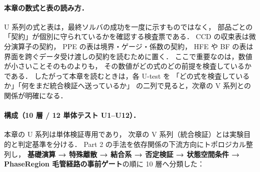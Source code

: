 \paragraph{本章の数式と表の読み方．}
U 系列の式と表は，最終ソルバの成功を一度に示すものではなく，
部品ごとの「契約」が個別に守られているかを確認する検査票である．
CCD の収束表は微分演算子の契約，
PPE の表は境界・ゲージ・係数の契約，
HFE や BF の表は界面を跨ぐデータ受け渡しの契約を読むために置く．
ここで重要なのは，数値が小さいことそのものよりも，
その数値がどの式のどの前提を検査しているかである．
したがって本章を読むときは，各 U-test を
「どの式を検査しているか」「何をまだ統合検証へ送っているか」
の二列で見ると，次章の V 系列との関係が明確になる．

\paragraph{構成（10 層 / 12 単体テスト U1--U12）．}
本章の U 系列は単体検証専用であり，
次章の V 系列（統合検証）とは実験目的と判定基準を分ける．
Part 2 の手法を依存関係の下流方向にトポロジカル整列し，
\textbf{基礎演算 → 特殊離散 → 結合系 → 否定検証 → 状態空間条件 → PhaseRegion 毛管経路の事前ゲート}の順に 10 層へ分類した：

